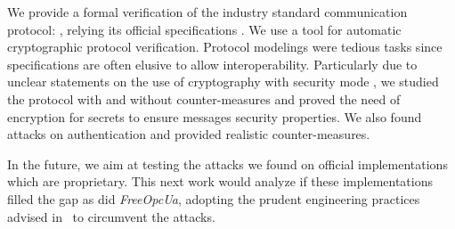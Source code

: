 We provide a formal verification of the industry standard
communication protocol: \opcua, relying its official specifications
\cite{MLD09,opcua_part2,opcua_part4,opcua_part6}.
We use \proverif{} a tool for automatic cryptographic protocol
verification.  Protocol modelings were tedious tasks since
specifications are often elusive to allow interoperability.
Particularly due to unclear statements on the use of cryptography with
security mode \sms, we studied the protocol with and without
counter-measures and proved the need of encryption for secrets to
ensure messages security properties.  We also found attacks on
authentication and provided realistic counter-measures.

In the future, we aim at testing the attacks we found on official
implementations which are proprietary. This next work would analyze
if these implementations filled the gap as did {\em FreeOpcUa}, 
adopting the prudent engineering practices advised in~\cite{AN96} to
circumvent the attacks.
